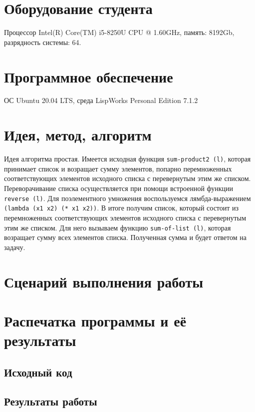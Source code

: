 \documentclass[12pt]{article}
\begin{document}
\section{Оборудование студента}
{\large Процессор Intel(R) Core(TM) i5-8250U CPU @ 1.60GHz, память: 8192Gb, разрядность системы: 64.}

\section{Программное обеспечение}
{\large ОС Ubuntu 20.04 LTS, среда LispWorks Personal Edition 7.1.2}

\section{Идея, метод, алгоритм}
{\large 
Идея алгоритма простая. Имеется исходная функция {\tt sum-product2 (l)}, которая 
принимает список и возращает сумму элементов, попарно перемноженных соответствующих
элементов исходного списка с перевернутым этим же списком. Переворачивание списка 
осуществляется при помощи встроенной функции {\tt reverse (l)}. Для поэлементного умножения
воспользуемся лямбда-выражением {\tt(lambda (x1 x2) (* x1 x2))}. В итоге получим список, который состоит из
перемноженных соответствующих элементов исходного списка с перевернутым 
этим же списком. Для него вызываем функцию {\tt sum-of-list (l)}, которая возращает 
сумму всех элементов списка. Полученная сумма и будет ответом на задачу.

}

\section{Сценарий выполнения работы}

\section{Распечатка программы и её результаты}

\subsection{Исходный код}


\subsection{Результаты работы}
% 
\end{document}

